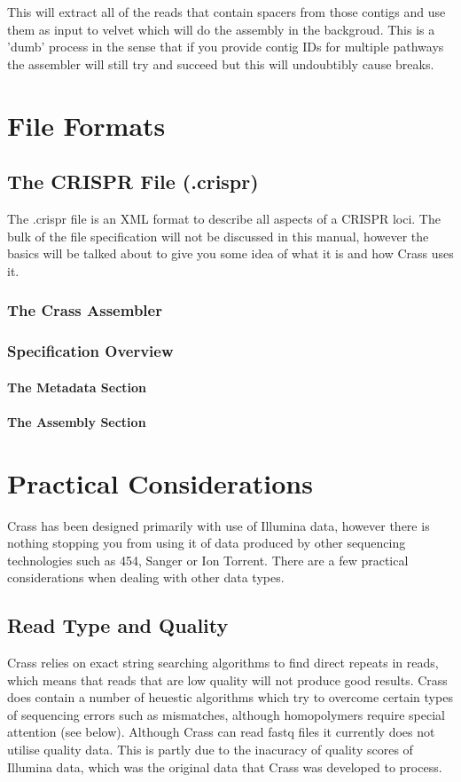 \documentclass[11pt]{article} %
\begin{document}
This will extract all of the reads that contain spacers from those contigs and use them as input to velvet which will do the assembly in the backgroud.  This is a 'dumb' process in the sense that if you provide contig IDs for multiple pathways the assembler will still try and succeed but this will undoubtibly cause breaks. 

\section{File Formats}
\label{sec:Fileformats}
\subsection{The CRISPR File (.crispr)}
The .crispr file is an XML format to describe all aspects of a CRISPR loci.  The bulk of the file specification will not be discussed in this manual, however the basics will be talked about to give you some idea of what it is and how Crass uses it.
\subsubsection{The Crass Assembler}
\subsubsection{Specification Overview}
\paragraph{The Metadata Section}
\paragraph{The Assembly Section}

\section{Practical Considerations}
Crass has been designed primarily with use of Illumina data, however there is nothing stopping you from using it of data produced by other sequencing technologies such as 454, Sanger or Ion Torrent.  There are a few practical considerations when dealing with other data types.
\subsection{Read Type and Quality}
 Crass relies on exact string searching algorithms to find direct repeats in reads, which means that reads that are low quality will not produce good results.  Crass does contain a number of heuestic algorithms which try to overcome certain types of sequencing errors such as mismatches, although homopolymers require special attention (see below).  Although Crass can read fastq files it currently does not utilise quality data.  This is partly due to the inacuracy of quality scores of Illumina data, which was the original data that Crass was developed to process. 
\end{document}
